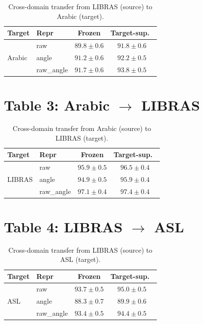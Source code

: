 \documentclass[11pt,a4paper]{article}
\begin{document}
\begin{table}[H]
\centering
\small
\caption{Cross-domain transfer from LIBRAS (source) to Arabic (target).}
\label{tab:libras-arabic}
\begin{tabular}{@{}llcc@{}}
\toprule
Target & Repr & Frozen & Target-sup.\ \\
\midrule
\multirow{3}{*}{Arabic}
  & raw        & $89.8 \pm 0.6$ & $91.8 \pm 0.6$ \\
  & angle      & $91.2 \pm 0.6$ & $92.2 \pm 0.5$ \\
  & raw\_angle & $\mathbf{91.7 \pm 0.6}$ & $\mathbf{93.8 \pm 0.5}$ \\
\bottomrule
\end{tabular}
\end{table}

\vspace{-0.5em}
\section*{Table 3: Arabic $\rightarrow$ LIBRAS}
\vspace{-0.5em}

\begin{table}[H]
\centering
\small
\caption{Cross-domain transfer from Arabic (source) to LIBRAS (target).}
\label{tab:arabic-libras}
\begin{tabular}{@{}llcc@{}}
\toprule
Target & Repr & Frozen & Target-sup.\ \\
\midrule
\multirow{3}{*}{LIBRAS}
  & raw        & $95.9 \pm 0.5$ & $96.5 \pm 0.4$ \\
  & angle      & $94.9 \pm 0.5$ & $95.9 \pm 0.4$ \\
  & raw\_angle & $\mathbf{97.1 \pm 0.4}$ & $\mathbf{97.4 \pm 0.4}$ \\
\bottomrule
\end{tabular}
\end{table}

\vspace{-0.5em}
\section*{Table 4: LIBRAS $\rightarrow$ ASL}
\vspace{-0.5em}

\begin{table}[H]
\centering
\small
\caption{Cross-domain transfer from LIBRAS (source) to ASL (target).}
\label{tab:libras-asl}
\begin{tabular}{@{}llcc@{}}
\toprule
Target & Repr & Frozen & Target-sup.\ \\
\midrule
\multirow{3}{*}{ASL}
  & raw        & $\mathbf{93.7 \pm 0.5}$ & $\mathbf{95.0 \pm 0.5}$ \\
  & angle      & $88.3 \pm 0.7$ & $89.9 \pm 0.6$ \\
  & raw\_angle & $93.4 \pm 0.5$ & $94.4 \pm 0.5$ \\
\bottomrule
\end{tabular}
\end{table}
\end{document}
